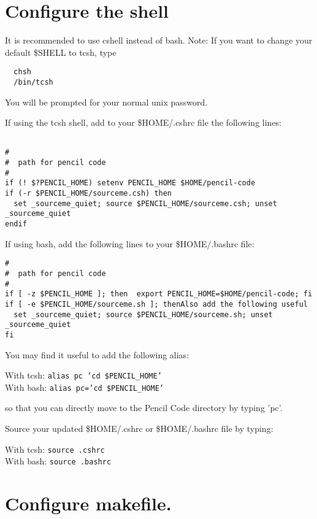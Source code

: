\documentclass[a4paper,12pt]{article}
\begin{document}

\section{Configure the shell}

It is recommended to use cshell instead of bash.
Note: If you want to change your default \$SHELL to tcsh, type

\begin{verbatim}
  chsh
  /bin/tcsh
\end{verbatim}

You will be prompted for your normal unix password.

If using the tcsh shell, add to your \$HOME/.cshrc file the following lines:
\begin{verbatim}

#
#  path for pencil code
#
if (! $?PENCIL_HOME) setenv PENCIL_HOME $HOME/pencil-code
if (-r $PENCIL_HOME/sourceme.csh) then
  set _sourceme_quiet; source $PENCIL_HOME/sourceme.csh; unset _sourceme_quiet
endif
\end{verbatim}


If using bash, add the following lines to your \$HOME/.bashrc file:
\begin{verbatim}
#
#  path for pencil code
#
if [ -z $PENCIL_HOME ]; then  export PENCIL_HOME=$HOME/pencil-code; fi
if [ -e $PENCIL_HOME/sourceme.sh ]; thenAlso add the following useful
  set _sourceme_quiet; source $PENCIL_HOME/sourceme.sh; unset _sourceme_quiet
fi
\end{verbatim}

You may find it useful to add the following alias:

With tcsh: \texttt{alias pc 'cd \$PENCIL\_HOME'} \\ %
With bash: \texttt{alias pc='cd \$PENCIL\_HOME'}

so that you can directly move to the Pencil Code directory by typing 'pc'.

Source your updated \$HOME/.cshrc or \$HOME/.bashrc file by typing:

With tcsh: \texttt{source .cshrc} \\ %
With bash: \texttt{source .bashrc}

\section{Configure makefile.}
\end{document}
